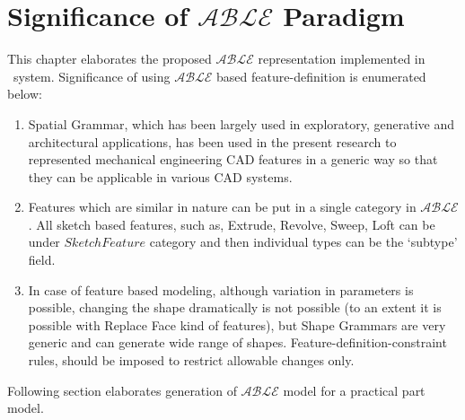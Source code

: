 \section{Significance of $\mathcal{ABLE}$ Paradigm}
This chapter elaborates the proposed $\mathcal{ABLE}$ representation implemented in \mysystemname~system. Significance of using $\mathcal{ABLE}$ based feature-definition is enumerated below:
	\begin{enumerate} [noitemsep,topsep=2pt,parsep=2pt,partopsep=2pt]
	\item Spatial Grammar, which has been largely used in exploratory, generative and architectural applications, has been used in the present research to represented mechanical engineering CAD features in a generic way so that they can be applicable in various CAD systems. 
	\item Features which are similar in nature can be put in a single category in $\mathcal{ABLE}$. All sketch based features, such as, Extrude, Revolve, Sweep, Loft can be under $SketchFeature$ category and then individual types can be the `subtype' field.
	\item In case of feature based modeling, although variation in parameters is possible, changing the shape dramatically is not possible (to an extent it is possible with Replace Face kind of features), but Shape Grammars are very generic and can generate wide range of shapes. Feature-definition-constraint rules, should be imposed to restrict allowable changes only.
	\end{enumerate}

Following section elaborates generation of {\bf $\mathcal{ABLE}$} model for a practical part model.

